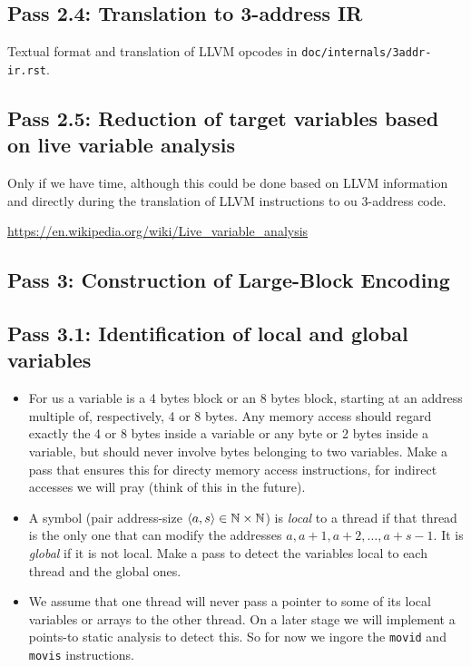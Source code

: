 \documentclass{llncs}
\begin{document}
\subsection*{Pass 2.4: Translation to 3-address IR}

Textual format and translation of LLVM opcodes in
\verb!doc/internals/3addr-ir.rst!.

\subsection*{Pass 2.5: Reduction of target variables based on live variable
analysis}

Only if we have time, although this could be done based on LLVM information and
directly during the translation of LLVM instructions to ou 3-address code.

\url{https://en.wikipedia.org/wiki/Live_variable_analysis}

\subsection*{Pass 3: Construction of Large-Block Encoding}

\subsection*{Pass 3.1: Identification of local and global variables}
\begin{itemize}
\item
  For us a variable is a 4 bytes block or an 8 bytes block, starting at an
  address multiple of, respectively, 4 or 8 bytes. Any memory access should
  regard exactly the 4 or 8 bytes inside a variable or any byte or 2 bytes inside a
  variable, but should never involve bytes belonging to two variables.
  Make a pass that ensures this for directy memory access instructions, for
  indirect accesses we will pray (think of this in the future).
\item
  A symbol (pair address-size $\langle a,s\rangle \in \mathbb{N} \times \mathbb{N}$) is \emph{local} to a
  thread if that thread is the only one that can modify the addresses
  $a, a+1, a+2, \ldots, a+s-1$.
  It is \emph{global} if it is not local.
  Make a pass to detect the variables local to each thread and the global ones.
\item
  We assume that one thread will never pass a pointer to some of its local
  variables or arrays to the other thread. On a later stage we will implement a
  points-to static analysis to detect this.
  So for now we ingore the \verb!movid! and \verb!movis! instructions.
\end{itemize}
\end{document}
